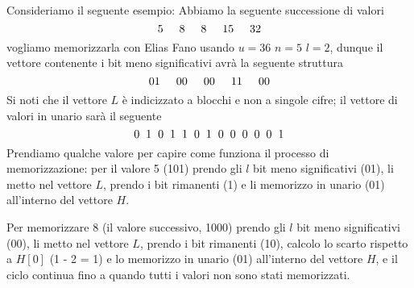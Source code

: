 Consideriamo il seguente esempio: Abbiamo la seguente successione di valori
\begin{equation}
	5\hspace{5mm}8\hspace{5mm}8\hspace{5mm}15\hspace{5mm}32
\end{equation}
vogliamo memorizzarla con Elias Fano usando $u = 36$ $n = 5$ $l = 2$, dunque il vettore contenente i bit meno significativi avrà la seguente struttura
\begin{equation}
	01\hspace{5mm}00\hspace{5mm}00\hspace{5mm}11\hspace{5mm}00
\end{equation}
Si noti che il vettore $L$ è indicizzato a blocchi e non a singole cifre; il vettore di valori in unario sarà il seguente
\begin{equation}
	0\hspace{2mm}1\hspace{2mm}0\hspace{2mm}1\hspace{2mm}1\hspace{2mm}0\hspace{2mm}1\hspace{2mm}0\hspace{2mm}0\hspace{2mm}0\hspace{2mm}0\hspace{2mm}0\hspace{2mm}1
\end{equation}
Prendiamo qualche valore per capire come funziona il processo di memorizzazione:
per il valore 5 (101) prendo gli $l$ bit meno significativi (01), li metto nel vettore $L$, prendo i bit rimanenti (1) e li memorizzo in unario (01) all'interno del vettore $H$.

Per memorizzare 8 (il valore successivo, 1000) prendo gli $l$ bit meno significativi (00), li metto nel vettore $L$, prendo i bit rimanenti (10), calcolo lo scarto rispetto a $H[0]$ (1 - 2 = 1) e lo memorizzo in unario (01) all'interno del vettore $H$, e il ciclo continua fino a quando tutti i valori non sono stati memorizzati.

